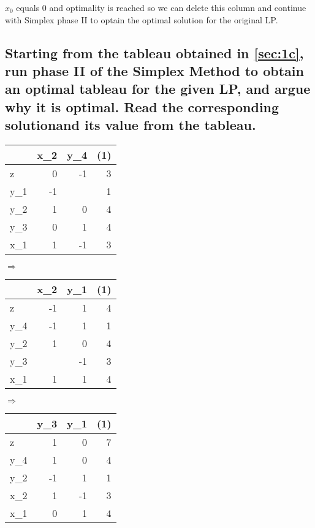 \documentclass[12pt, a4]{article}
\begin{document}
$x_0$ equals 0 and optimality is reached so we can delete this column and continue with Simplex phase II to optain the optimal solution for the original LP.

\subsection{Starting from the tableau obtained in \ref{sec:1c}, run phase II of the Simplex Method to obtain an optimal tableau for the given LP, and argue why it is optimal. Read the corresponding solutionand its value from the tableau.}{\label{sec:1d}}

\begin{minipage}[t]{.3\textwidth}
	\centering
	\begin{tabular}{L|RR||R}
		&  x_2 & y_4 & (1)  \\
		\hline
		z &  0 & -1 & 3 \\
		\hline
		y_1 &-1 &  & 1 \\
		y_2 & 1 & 0 & 4 \\
		y_3 & 0 & 1 & 4 \\
		x_1 & 1 &-1 & 3 \\
	\end{tabular}
\end{minipage}
$\Rightarrow$
\begin{minipage}[t]{.3\textwidth}
	\centering
	\begin{tabular}{L|RR||R}
		&  x_2 & y_1 & (1)  \\
		\hline
		z &  -1 & 1 & 4 \\
		\hline
		y_4 &-1 & 1 & 1 \\
		y_2 & 1 & 0 & 4 \\
		y_3 &  &-1 & 3 \\
		x_1 & 1 & 1 & 4 \\
	\end{tabular}
\end{minipage}
$\Rightarrow$
\begin{minipage}[t]{.3\textwidth}
	\centering
	\begin{tabular}{L|RR||R}
		&  y_3 & y_1 & (1)  \\
		\hline
		z   & 1 & 0 & 7 \\
		\hline
		y_4 & 1 & 0 & 4 \\
		y_2 &-1 & 1 & 1 \\
		x_2 & 1 &-1 & 3 \\
		x_1 & 0 & 1 & 4 \\
	\end{tabular}
\end{minipage}
\end{document}
